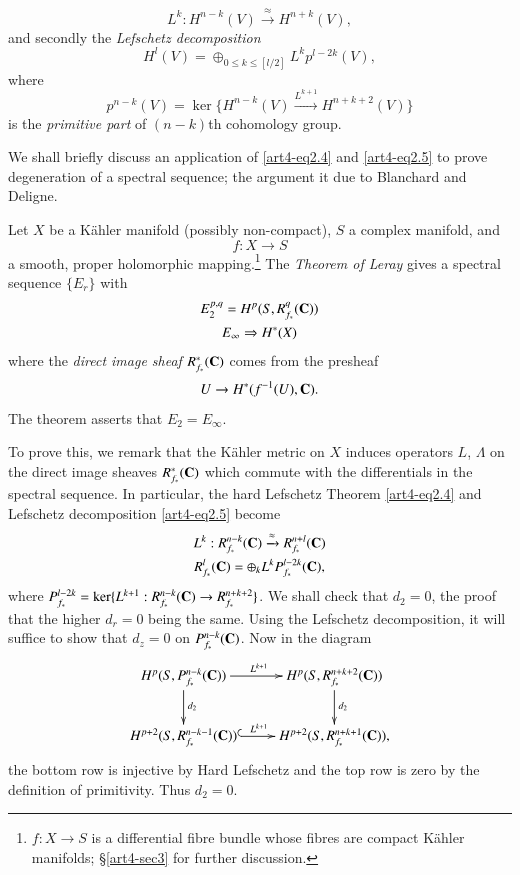 \begin{equation}
L^k : H^{n-k} (V) \xrightarrow{\approx} H^{n+k} (V), \label{art4-eq2.4}
\end{equation}
and secondly the \textit{Lefschetz decomposition}
\begin{equation}
H^l (V) = \oplus_{0 \leqslant k \leqslant [l/2]} L^k p^{l-2k} (V), \label{art4-eq2.5}
\end{equation}\pageoriginale
where 
\begin{equation}
p^{n-k} (V) = \ker\{H^{n-k} (V) \xrightarrow{L^{k+1}} H^{n+k+2} (V)\} \label{art4-eq2.6}
\end{equation}
is the \textit{primitive part} of $(n-k)$th cohomology group.

We shall briefly discuss an application of \eqref{art4-eq2.4} and \eqref{art4-eq2.5} to prove degeneration of a spectral sequence; the argument it due to Blanchard and Deligne.

Let $X$ be a K\"{a}hler manifold (possibly non-compact), $S$ a complex manifold, and 
$$
f: X \to S
$$
a smooth, proper holomorphic mapping.\footnote{$f: X \to S$ is a differential fibre bundle whose fibres are compact K\"{a}hler manifolds; \cf \S \ref{art4-sec3} for further discussion.} The \textit{Theorem of Leray} \cite{art4-key17} gives a spectral sequence $\{E_r\}$ with 
\begin{gather*}
E^{p,q}_2 = H^p (S, R^q_{f_\ast} (\mathbf{C}))\\
E_{\infty} \Rightarrow H^\ast (X)
\end{gather*}
where the \textit{direct image sheaf} $R^\ast_{f_\ast} (\mathbf{C})$ comes from the presheaf
$$
U \to H^\ast (f^{-1} (U), \mathbf{C}).
$$
The theorem asserts that $E_2 = E_\infty$.

To prove this, we remark that the K\"{a}hler metric on $X$ induces operators $L$, $\Lambda$ on the direct image sheaves $R^\ast_{f_\ast} (\mathbf{C})$ which commute with the differentials in the spectral sequence. In particular, the hard Lefschetz Theorem \eqref{art4-eq2.4} and Lefschetz decomposition \eqref{art4-eq2.5} become
\begin{gather*}
L^k : R^{n-k}_{f_\ast} (\mathbf{C}) \xrightarrow{\approx} R^{n+l}_{f_\ast} (\mathbf{C})\\
R^l_{f_{\ast}} (\mathbf{C}) = \oplus_k L^k P^{l-2k}_{f_\ast} (\mathbf{C}),
\end{gather*}
where $P^{l-2k}_{f_\ast} = \ker \{L^{k+1}: R^{n-k}_{f_\ast} (\mathbf{C}) \to R^{n+k+2}_{f_\ast}\}$. We shall check that $d_2 =0$, the proof that the higher $d_r=0$ being the same. Using the Lefschetz decomposition, it will suffice to show that $d_z =0$ on $P^{n-k}_{f_\ast} (\mathbf{C})$. Now in the diagram
$$
\xymatrix{
H^p (S, P^{n-k}_{f_\ast} (\bC)) \ar[d]^{d_2} \ar[r]^{L^{k+1}} & H^p (S, R^{n+k+2}_{f_\ast} (\bC)) \ar[d]^{d_2}\\
H^{p+2} (S, R^{n-k-1}_{f_\ast} (\bC))  \ar@{^{(}->}[r]^{L^{k+1}} & H^{p+2} (S, R^{n+k+1}_{f_\ast} (\bC)),
}
$$\pageoriginale
the bottom row is injective by Hard Lefschetz and the top row is zero by the definition of primitivity. Thus $d_2 =0$. 

